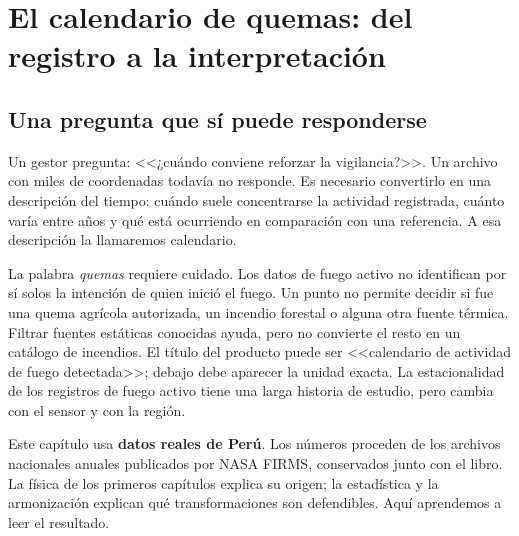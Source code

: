 \chapter{El calendario de quemas: del registro a la interpretación}\label{cap:calendario}


\FloatBarrier
\section{Una pregunta que sí puede responderse}

Un gestor pregunta: <<¿cuándo conviene reforzar la vigilancia?>>. Un archivo con miles de
coordenadas todavía no responde. Es necesario convertirlo en una descripción del tiempo:
cuándo suele concentrarse la actividad registrada, cuánto varía entre años y qué está
ocurriendo en comparación con una referencia. A esa descripción la llamaremos calendario.

La palabra \emph{quemas} requiere cuidado. Los datos de fuego activo no identifican por sí
solos la intención de quien inició el fuego. Un punto no permite decidir si fue una quema
agrícola autorizada, un incendio forestal o alguna otra fuente térmica. Filtrar fuentes
estáticas conocidas ayuda, pero no convierte el resto en un catálogo de incendios. El título
del producto puede ser <<calendario de actividad de fuego detectada>>; debajo debe aparecer
la unidad exacta. La estacionalidad de los registros de fuego activo tiene una larga historia
de estudio, pero cambia con el sensor y con la región.

Este capítulo usa \textbf{datos reales de Perú}. Los números proceden de los archivos
nacionales anuales publicados por NASA FIRMS, conservados junto con el libro.
La física de los primeros capítulos explica su origen; la estadística y la armonización
explican qué transformaciones son defendibles. Aquí aprendemos a leer el resultado.

